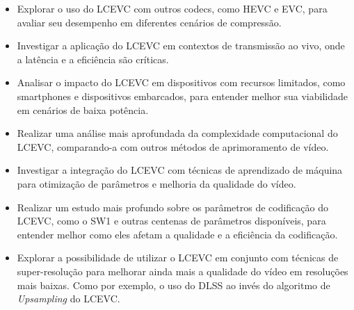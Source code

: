 \begin{itemize}
    \item Explorar o uso do \acrshort{LCEVC} com outros codecs, como \acrshort{HEVC} e \acrshort{EVC}, para avaliar
    seu desempenho em diferentes cenários de compressão.
    \item Investigar a aplicação do \acrshort{LCEVC} em contextos de transmissão ao vivo, onde a latência e a eficiência
    são críticas.
    \item Analisar o impacto do \acrshort{LCEVC} em dispositivos com recursos limitados, como smartphones e dispositivos
    embarcados, para entender melhor sua viabilidade em cenários de baixa potência.
    \item Realizar uma análise mais aprofundada da complexidade computacional do \acrshort{LCEVC}, comparando-a com outros
    métodos de aprimoramento de vídeo.
    \item Investigar a integração do \acrshort{LCEVC} com técnicas de aprendizado de máquina para otimização
    de parâmetros e melhoria da qualidade do vídeo.
    \item Realizar um estudo mais profundo sobre os parâmetros de codificação do \acrshort{LCEVC}, como o SW1 e outras centenas
    de parâmetros disponíveis, para entender melhor como eles afetam a qualidade e a eficiência da codificação.
    \item Explorar a possibilidade de utilizar o \acrshort{LCEVC} em conjunto com técnicas de super-resolução
    para melhorar ainda mais a qualidade do vídeo em resoluções mais baixas. Como por exemplo, o uso do \acrfull{DLSS} ao
    invés do algoritmo de \textit{Upsampling} do \acrshort{LCEVC}.
\end{itemize}